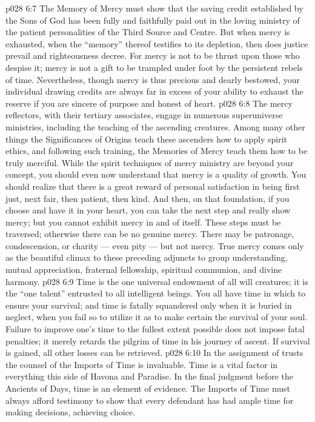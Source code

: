 \vs p028 6:7 The Memory of Mercy must show that the saving credit established by the Sons of God has been fully and faithfully paid out in the loving ministry of the patient personalities of the Third Source and Centre. But when mercy is exhausted, when the “memory” thereof testifies to its depletion, then does justice prevail and righteousness decree. For mercy is not to be thrust upon those who despise it; mercy is not a gift to be trampled under foot by the persistent rebels of time. Nevertheless, though mercy is thus precious and dearly bestowed, your individual drawing credits are always far in excess of your ability to exhaust the reserve if you are sincere of purpose and honest of heart.
\vs p028 6:8 \pc The mercy reflectors, with their tertiary associates, engage in numerous superuniverse ministries, including the teaching of the ascending creatures. Among many other things the Significances of Origins teach these ascenders how to apply spirit ethics, and following such training, the Memories of Mercy teach them how to be truly merciful. While the spirit techniques of mercy ministry are beyond your concept, you should even now understand that mercy is a quality of growth. You should realize that there is a great reward of personal satisfaction in being first just, next fair, then patient, then kind. And then, on that foundation, if you choose and have it in your heart, you can take the next step and really show mercy; but you cannot exhibit mercy in and of itself. These steps must be traversed; otherwise there can be no genuine mercy. There may be patronage, condescension, or charity --- even pity --- but not mercy. True mercy comes only as the beautiful climax to these preceding adjuncts to group understanding, mutual appreciation, fraternal fellowship, spiritual communion, and divine harmony.
\vs p028 6:9 \bibnobreakspace {} Time is the one universal endowment of all will creatures; it is the “one talent” entrusted to all intelligent beings. You all have time in which to ensure your survival; and time is fatally squandered only when it is buried in neglect, when you fail so to utilize it as to make certain the survival of your soul. Failure to improve one’s time to the fullest extent possible does not impose fatal penalties; it merely retards the pilgrim of time in his journey of ascent. If survival is gained, all other losses can be retrieved.
\vs p028 6:10 In the assignment of trusts the counsel of the Imports of Time is invaluable. Time is a vital factor in everything this side of Havona and Paradise. In the final judgment before the Ancients of Days, time is an element of evidence. The Imports of Time must always afford testimony to show that every defendant has had ample time for making decisions, achieving choice.
